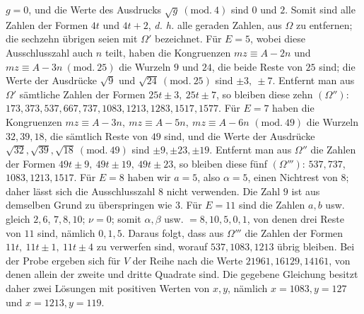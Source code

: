 \(g=0\), und die Werte des Ausdrucks \(\surd{g}\ (\mathrm{mod.}\ 4)\) sind \(0\) und \(2\). Somit sind alle Zahlen der Formen \(4t\) und \(4t+2\), \textit{d. h.} alle geraden Zahlen, aus \(\Omega\) zu entfernen; die sechzehn übrigen seien mit \(\Omega'\) bezeichnet. Für \(E=5\), wobei diese Ausschlusszahl auch \(n\) teilt, haben die Kongruenzen \(mz\equiv A-2n\) und \(mz\equiv A-3n\ (\mathrm{mod.}\ 25)\) die Wurzeln \(9\) und \(24\), die beide Reste von \(25\) sind; die Werte der Ausdrücke \(\surd9\) und \(\surd{24}\ (\mathrm{mod.}\ 25)\) sind \(\pm3,\allowbreak \ \pm7\). Entfernt man aus \(\Omega'\) sämtliche Zahlen der Formen \(25t\pm3,\allowbreak \ 25t\pm7\), so bleiben diese zehn \((\Omega'')\): \(173,\allowbreak 373,\allowbreak 537,\allowbreak 667,\allowbreak 737,\allowbreak 1083,\allowbreak 1213,\allowbreak 1283,\allowbreak 1517,\allowbreak 1577\). Für \(E=7\) haben die Kongruenzen \(mz\equiv A-3n,\allowbreak \ mz\equiv A-5n,\allowbreak \ mz\equiv A-6n\) \((\mathrm{mod.}\ 49)\) die Wurzeln \(32,\allowbreak 39,\allowbreak 18\), die sämtlich Reste von \(49\) sind, und die Werte der Ausdrücke \(\surd{32},\allowbreak \surd{39},\allowbreak \surd{18}\ (\mathrm{mod.}\ 49)\) sind \(\pm9,\allowbreak \pm23,\allowbreak \pm19\). Entfernt man aus \(\Omega''\) die Zahlen der Formen \(49t\pm9,\allowbreak \ 49t\pm19,\allowbreak \ 49t\pm23\), so bleiben diese fünf \((\Omega''')\): \(537,\allowbreak 737\), \(1083,\allowbreak 1213,\allowbreak 1517\). Für \(E=8\) haben wir \(a=5\), also \(\alpha=5\), einen Nichtrest von \(8\); daher lässt sich die Ausschlusszahl \(8\) nicht verwenden. Die Zahl \(9\) ist aus demselben Grund zu überspringen wie \(3\). Für \(E=11\) sind die Zahlen \(a,\allowbreak b\) usw. gleich \(2,\allowbreak 6\), \(7,\allowbreak 8,\allowbreak 10\); \(\nu=0\); somit \(\alpha,\allowbreak \beta\) usw. \(=8,\allowbreak 10,\allowbreak 5,\allowbreak 0,\allowbreak 1\), von denen drei Reste von \(11\) sind, nämlich \(0,\allowbreak 1,\allowbreak 5\). Daraus folgt, dass aus \(\Omega'''\) die Zahlen der Formen \(11t,\allowbreak \ 11t\pm1,\allowbreak \ 11t\pm4\) zu verwerfen sind, worauf \(537,\allowbreak 1083,\allowbreak 1213\) übrig bleiben. Bei der Probe ergeben sich für \(V\) der Reihe nach die Werte \(21961,\allowbreak 16129,\allowbreak 14161\), von denen allein der zweite und dritte Quadrate sind. Die gegebene Gleichung besitzt daher zwei Lösungen mit positiven Werten von \(x,\allowbreak y\), nämlich \(x=1083,\allowbreak y=127\) und \(x=1213,\allowbreak y=119\).

